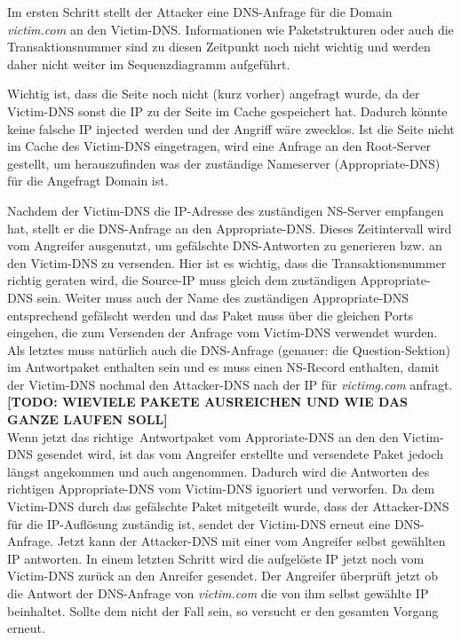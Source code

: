 \documentclass[10pt,a4paper]{article}
\begin{document}
Im ersten Schritt stellt der Attacker eine DNS-Anfrage für die Domain \emph{victim.com} an den Victim-DNS. Informationen wie Paketstrukturen oder auch die Transaktionsnummer sind zu diesen Zeitpunkt noch nicht wichtig und werden daher nicht weiter im Sequenzdiagramm aufgeführt.

Wichtig ist, dass die Seite noch nicht (kurz vorher) angefragt wurde, da der Victim-DNS sonst die IP zu der Seite im Cache gespeichert hat. Dadurch könnte keine falsche IP \glqq injected\grqq\ werden und der Angriff wäre zwecklos. Ist die Seite nicht im Cache des Victim-DNS eingetragen, wird eine Anfrage an den Root-Server gestellt, um herauszufinden was der zuständige Nameserver (Appropriate-DNS) für die Angefragt Domain ist.

Nachdem der Victim-DNS die IP-Adresse des zuständigen NS-Server empfangen hat, stellt er die DNS-Anfrage an den Appropriate-DNS. Dieses Zeitintervall wird vom Angreifer ausgenutzt, um gefälschte DNS-Antworten zu generieren bzw. an den Victim-DNS zu versenden. Hier ist es wichtig, dass die Transaktionsnummer richtig geraten wird, die Source-IP muss gleich dem zuständigen Appropriate-DNS sein. Weiter muss auch der Name des zuständigen Appropriate-DNS entsprechend gefälscht werden und das Paket muss über die gleichen Ports eingehen, die zum Versenden der Anfrage vom Victim-DNS verwendet wurden. Als letztes muss natürlich auch die DNS-Anfrage (genauer: die Question-Sektion) im Antwortpaket enthalten sein und es muss einen NS-Record enthalten, damit der Victim-DNS nochmal den Attacker-DNS nach der IP für \emph{victimg.com} anfragt.\\

\textbf{[TODO: WIEVIELE PAKETE AUSREICHEN UND WIE DAS GANZE LAUFEN SOLL]}\\

Wenn jetzt das \glqq richtige\grqq\ Antwortpaket vom Approriate-DNS an den den Victim-DNS gesendet wird, ist das vom Angreifer erstellte und versendete Paket jedoch längst angekommen und auch angenommen. Dadurch wird die Antworten des richtigen Appropriate-DNS vom Victim-DNS ignoriert und verworfen. Da dem Victim-DNS durch das gefälschte Paket mitgeteilt wurde, dass der Attacker-DNS für die IP-Auflösung zuständig ist, sendet der Victim-DNS erneut eine DNS-Anfrage. Jetzt kann der Attacker-DNS mit einer vom Angreifer selbst gewählten IP antworten. In einem letzten Schritt wird die aufgelöste IP jetzt noch vom Victim-DNS zurück an den Anreifer gesendet. Der Angreifer überprüft jetzt ob die Antwort der DNS-Anfrage von \emph{victim.com} die von ihm selbst gewählte IP beinhaltet. Sollte dem nicht der Fall sein, so versucht er den gesamten Vorgang erneut.
\end{document}
